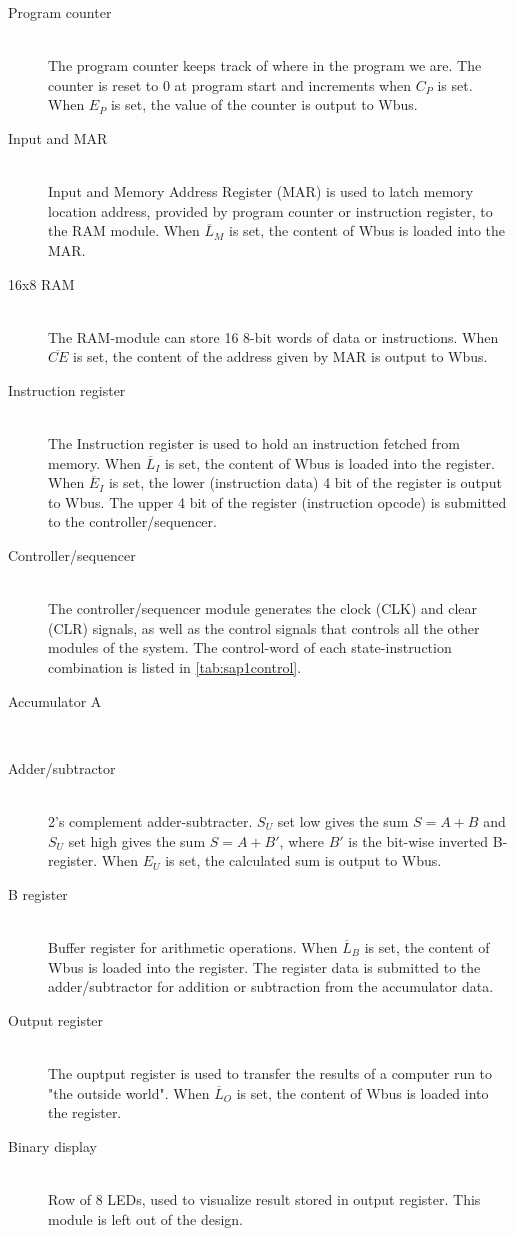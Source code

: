 \begin{description}
    \item[Program counter] \hfill \\
    The program counter keeps track of where in the program we are. The counter is reset to 0 at program start and increments when $C_P$ is set. When $E_P$ is set, the value of the counter is output to Wbus.
    \item[Input and MAR] \hfill \\
    Input and Memory Address Register (MAR) is used to latch  memory location address, provided by program counter or instruction register, to the RAM module. When $\overline{L}_M$ is set, the content of Wbus is loaded into the MAR.  
    \item[16x8 RAM] \hfill \\
    The RAM-module can store 16 8-bit words of data or instructions. When $\overline{CE}$ is set, the content of the address given by MAR is output to Wbus.
    \item[Instruction register] \hfill \\
    The Instruction register is used to hold an instruction fetched from memory. When $\overline{L}_I$ is set, the content of Wbus is loaded into the register. When $\overline{E}_I$ is set, the lower (instruction data) 4 bit of the register is output to Wbus. The upper 4 bit of the register (instruction opcode) is submitted to the controller/sequencer.
    \item[Controller/sequencer] \hfill \\
    The controller/sequencer module generates the clock (CLK) and clear (CLR) signals, as well as the control signals that controls all the other modules of the system. The control-word of each state-instruction combination is listed in \cref{tab:sap1control}.
    \item[Accumulator A] \hfill \\
    
    \item[Adder/subtractor] \hfill \\
    2's complement adder-subtracter. $S_U$ set low gives the sum $S=A+B$ and $S_U$ set high gives the sum $S=A+B'$, where $B'$ is the bit-wise inverted B-register. When $E_U$ is set, the calculated sum is output to Wbus.
    \item[B register] \hfill \\
    Buffer register for arithmetic operations. When $\overline{L}_B$ is set, the content of Wbus is loaded into the register. The register data is submitted to the adder/subtractor for addition or subtraction from the accumulator data.
    \item[Output register] \hfill \\
    The ouptput register is used to transfer the results of a computer run to "the outside world". When $\overline{L}_O$ is set, the content of Wbus is loaded into the register. 
    \item[Binary display] \hfill \\
    Row of 8 LEDs, used to visualize result stored in output register. This module is left out of the design.
\end{description}
